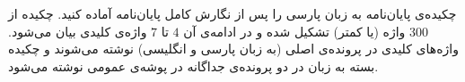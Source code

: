 
چکیده‌ی پایان‌نامه به زبان پارسی را پس از نگارش کامل پایان‌نامه آماده کنید. چکیده از $300$ واژه (یا کمتر) تشکیل شده و در ادامه‌ی آن $4$ تا $7$ واژه‌ی کلیدی بیان می‌شود. واژه‌های کلیدی در پرونده‌ی اصلی (به زبان پارسی و انگلیسی) نوشته می‌شوند و چکیده بسته به زبان در دو پرونده‌ی جداگانه در پوشه‌ی عمومی نوشته می‌شود.
